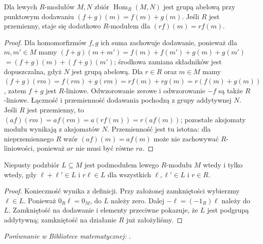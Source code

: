 \begin{stwierdzenie}
\label{aa:st:modules-hom-abelian}
Dla lewych $R$-modułów $M,N$ zbiór
$\operatorname{Hom}_R(M,N)$ jest grupą abelową przy
punktowym dodawaniu $(f+g)(m)=f(m)+g(m)$.
Jeśli $R$ jest przemienny, staje się dodatkowo
$R$-modułem dla $(rf)(m)=r f(m)$.
\end{stwierdzenie}
\begin{proof}
Dla homomorfizmów $f,g$ ich suma zachowuje dodawanie,
ponieważ dla $m,m'\in M$ mamy
$(f+g)(m+m')=f(m)+f(m')+g(m)+g(m')$
$=(f+g)(m)+(f+g)(m')$; środkowa zamiana
składników jest dopuszczalna, gdyż $N$ jest grupą abelową.
Dla $r\in R$ oraz $m\in M$ mamy
$(f+g)(rm)=f(rm)+g(rm)=rf(m)+rg(m)
=r(f(m)+g(m))$, zatem $f+g$ jest $R$-liniowe.
Odwzorowanie zerowe i odwzorowanie $-f$ są także
$R$-liniowe. Łączność i przemienność dodawania
pochodzą z grupy addytywnej $N$.
Jeśli $R$ jest przemienny, to
$(af)(rm)=a f(rm)=a(rf(m))=r(af(m))$;
pozostałe aksjomaty modułu wynikają z aksjomatów $N$.
Przemienność jest tu istotna: dla nieprzemiennego
$R$ wzór $(af)(m)=af(m)$ może nie zachowywać
$R$-liniowości, ponieważ $ar$ nie musi być równe $ra$.
\end{proof}

\begin{lemat}
\label{aa:lem:modules-submodule-test}
Niepusty podzbiór $L\subseteq M$ jest podmodułem
lewego $R$-modułu $M$ wtedy i tylko wtedy, gdy
$\ell+\ell'\in L$ i $r\ell\in L$ dla
wszystkich $\ell,\ell'\in L$ i $r\in R$.
\end{lemat}
\begin{proof}
Konieczność wynika z definicji. Przy założonej
zamkniętości wybierzmy $\ell\in L$.
Ponieważ $0_R\ell=0_M$, do $L$ należy zero.
Dalej $-\ell=(-1_R)\ell$ należy do $L$.
Zamkniętość na dodawanie i elementy przeciwne
pokazuje, że $L$ jest podgrupą addytywną;
zamkniętość na działanie $R$ już założyliśmy.
\end{proof}

\noindent\emph{Porównanie w Bibliotece matematycznej:} .

